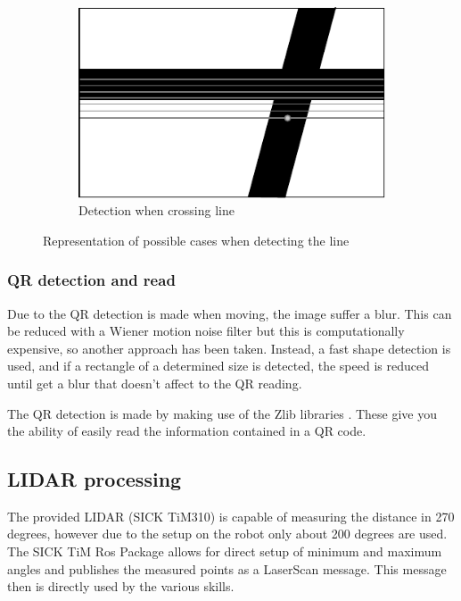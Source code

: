 \begin{figure}
\begin{subfigure}[H]{0.296\textwidth}
	            \includegraphics[width=\textwidth]{figs/mr_camera_processing_3}
	            \caption{Detection when crossing line}
	            \label{fig:mr_camera_processing_3}
	    	\end{subfigure}
	    \caption{Representation of possible cases when detecting the line}
	    \end{figure}

	\subsubsection{QR detection and read} %
	\label{ssub:qr_detection_and_read}
	Due to the QR detection is made when moving, the image suffer a blur.
	This can be reduced with a Wiener motion noise filter but this is computationally expensive, so another approach has been taken.
	Instead, a fast shape detection is used, and if a rectangle of a determined size is detected, the speed is reduced until get a blur that doesn't affect to the QR reading.

	The QR detection is made by making use of the Zlib libraries \cite{zlib}. 
	These give you the ability of easily read the information contained in a QR code.



	\subsection{LIDAR processing} %
	\label{sub:mr_lidar_processing}
	The provided LIDAR (SICK TiM310) is capable of measuring the distance in 270 degrees, however due to the setup on the robot only about 200 degrees are used. The SICK TiM Ros Package \cite{sick_tim} allows for direct setup of minimum and maximum angles and publishes the measured points as a LaserScan message. This message then is directly used by the various skills.

